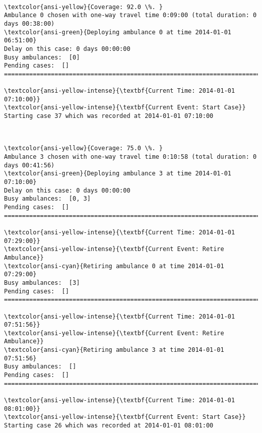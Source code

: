 \documentclass[11pt]{article}
\begin{document}
    \begin{center}
    \end{center}
    { \hspace*{\fill} \\}
    
    \begin{Verbatim}[commandchars=\\\{\}]
\textcolor{ansi-yellow}{Coverage: 92.0 \%. }
Ambulance 0 chosen with one-way travel time 0:09:00 (total duration: 0 days 00:38:00)
\textcolor{ansi-green}{Deploying ambulance 0 at time 2014-01-01 06:51:00}
Delay on this case: 0 days 00:00:00
Busy ambulances:  [0]
Pending cases:  []
========================================================================

\textcolor{ansi-yellow-intense}{\textbf{Current Time: 2014-01-01 07:10:00}}
\textcolor{ansi-yellow-intense}{\textbf{Current Event: Start Case}}
Starting case 37 which was recorded at 2014-01-01 07:10:00

    \end{Verbatim}

    \begin{center}
    \end{center}
    { \hspace*{\fill} \\}
    
    \begin{Verbatim}[commandchars=\\\{\}]
\textcolor{ansi-yellow}{Coverage: 75.0 \%. }
Ambulance 3 chosen with one-way travel time 0:10:58 (total duration: 0 days 00:41:56)
\textcolor{ansi-green}{Deploying ambulance 3 at time 2014-01-01 07:10:00}
Delay on this case: 0 days 00:00:00
Busy ambulances:  [0, 3]
Pending cases:  []
========================================================================

\textcolor{ansi-yellow-intense}{\textbf{Current Time: 2014-01-01 07:29:00}}
\textcolor{ansi-yellow-intense}{\textbf{Current Event: Retire Ambulance}}
\textcolor{ansi-cyan}{Retiring ambulance 0 at time 2014-01-01 07:29:00}
Busy ambulances:  [3]
Pending cases:  []
========================================================================

\textcolor{ansi-yellow-intense}{\textbf{Current Time: 2014-01-01 07:51:56}}
\textcolor{ansi-yellow-intense}{\textbf{Current Event: Retire Ambulance}}
\textcolor{ansi-cyan}{Retiring ambulance 3 at time 2014-01-01 07:51:56}
Busy ambulances:  []
Pending cases:  []
========================================================================

\textcolor{ansi-yellow-intense}{\textbf{Current Time: 2014-01-01 08:01:00}}
\textcolor{ansi-yellow-intense}{\textbf{Current Event: Start Case}}
Starting case 26 which was recorded at 2014-01-01 08:01:00

    \end{Verbatim}
\end{document}
